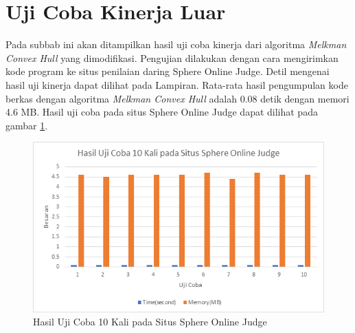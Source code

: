 \section{Uji Coba Kinerja Luar}
Pada subbab ini akan ditampilkan hasil uji coba kinerja dari algoritma \textit{Melkman Convex Hull} yang dimodifikasi. Pengujian dilakukan dengan cara mengirimkan kode program ke situs penilaian daring Sphere Online Judge. Detil mengenai hasil uji kinerja dapat dilihat pada Lampiran. Rata-rata hasil pengumpulan kode berkas dengan algoritma \textit{Melkman Convex Hull} adalah 0.08 detik dengan memori 4.6 MB. Hasil uji coba pada situs Sphere Online Judge dapat dilihat pada gambar \ref{fig:hasil-uji-coba-10-kali}.
\begin{figure}[!h]
	\Centering
	\includegraphics [width=\columnwidth]{bab5/img/hasil-uji-coba-10-kali}
	\caption {Hasil Uji Coba 10 Kali pada Situs Sphere Online Judge}
	\label {fig:hasil-uji-coba-10-kali}
\end{figure}


